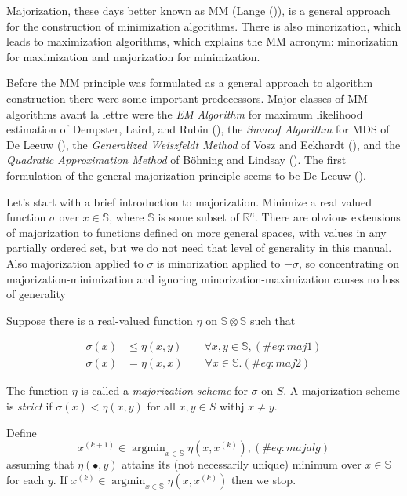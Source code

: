 \documentclass[
  12pt,
  letterpaper,
  DIV=11,
  numbers=noendperiod]{scrartcl}
\begin{document}
Majorization, these days better known as MM (Lange
()), is a general approach for the
construction of minimization algorithms. There is also minorization,
which leads to maximization algorithms, which explains the MM acronym:
minorization for maximization and majorization for minimization.

Before the MM principle was formulated as a general approach to
algorithm construction there were some important predecessors. Major
classes of MM algorithms avant la lettre were the \emph{EM Algorithm}
for maximum likelihood estimation of Dempster, Laird, and Rubin
(), the \emph{Smacof
Algorithm} for MDS of De Leeuw (), the
\emph{Generalized Weiszfeldt Method} of Vosz and Eckhardt
(), and the \emph{Quadratic
Approximation Method} of Böhning and Lindsay
(). The first formulation of the
general majorization principle seems to be De Leeuw
().

Let's start with a brief introduction to majorization. Minimize a real
valued function \(\sigma\) over \(x\in\mathbb{S}\), where \(\mathbb{S}\)
is some subset of \(\mathbb{R}^n\). There are obvious extensions of
majorization to functions defined on more general spaces, with values in
any partially ordered set, but we do not need that level of generality
in this manual. Also majorization applied to \(\sigma\) is minorization
applied to \(-\sigma\), so concentrating on majorization-minimization
and ignoring minorization-maximization causes no loss of generality

Suppose there is a real-valued function \(\eta\) on
\(\mathbb{S}\otimes\mathbb{S}\) such that

\begin{align}
\sigma(x)&\leq\eta(x,y)\qquad\forall x,y\in\mathbb{S},(\#eq:maj1)\\
\sigma(x)&=\eta(x,x)\qquad\forall x\in\mathbb{S}.(\#eq:maj2)
\end{align}

The function \(\eta\) is called a \emph{majorization scheme} for
\(\sigma\) on \(S\). A majorization scheme is \emph{strict} if
\(\sigma(x)<\eta(x,y)\) for all \(x,y\in S\) withj \(x\not=y\).

Define \begin{equation}
x^{(k+1)}\in\mathop{\text{argmin}}_{x\in\mathbb{S}}\eta(x,x^{(k)}),
(\#eq:majalg)
\end{equation} assuming that \(\eta(\bullet,y)\) attains its (not
necessarily unique) minimum over \(x\in\mathbb{S}\) for each \(y\). If
\(x^{(k)}\in\mathop{\text{argmin}}_{x\in\mathbb{S}}\eta(x,x^{(k)})\)
then we stop.
\end{document}
